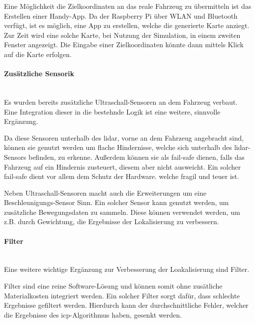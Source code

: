 Eine Möglichkeit die Zielkoordinaten an das reale Fahrzeug zu übermitteln ist das Erstellen einer Handy-App.
Da der Raspberry Pi über WLAN und Bluetooth verfügt, ist es möglich, eine App zu erstellen, welche die generierte Karte anziegt.
Zur Zeit wird eine solche Karte, bei Nutzung der Simulation, in einem zweiten Fenster angezeigt.
Die Eingabe einer Zielkoordinaten könnte dann mittels Klick auf die Karte erfolgen.

\paragraph{Zusätzliche Sensorik} \mbox{}\\
Es wurden bereits zusätzliche Ultraschall-Sensoren an dem Fahrzeug verbaut.
Eine Integration dieser in die bestehnde Logik ist eine weitere, sinnvolle Ergänzung.

Da diese Sensoren unterhalb des \ac{lidar}, vorne an dem Fahrzeug angebracht sind,
können sie genutzt werden um flache Hindernisse, welche sich unterhalb des \ac{lidar}-Sensors befinden, zu erkenne.
Außerdem können sie als fail-safe dienen, falls das Fahrzeug auf ein Hindernis zusteuert, diesem aber nicht ausweicht.
Ein solcher fail-safe dient vor allem dem Schutz der Hardware. welche fragil und teuer ist.

Neben Ultraschall-Sensoren macht auch die Erweiterungen um eine Beschleunigungs-Sensor Sinn.
Ein solcher Sensor kann genutzt werden, um zusätzliche Bewegungsdaten zu sammeln.
Diese können verwendet werden, um z.B. durch Gewichtung, die Ergebnisse der Lokalisierung zu verbessern.

\paragraph{Filter} \mbox{}\\
Eine weitere wichtige Ergänzung zur Verbesserung der Loakalisierung sind Filter.

Filter sind eine reine Software-Lösung und können somit ohne zusätliche Materialkosten integriert werden.
Ein solcher Filter sorgt dafür, dass schlechte Ergebnisse gefiltert werden.
Hierdurch kann der durchschnittliche Fehler, welcher die Ergebnisse des \ac{icp}-Algorithmus haben, gesenkt werden.

\newpage
